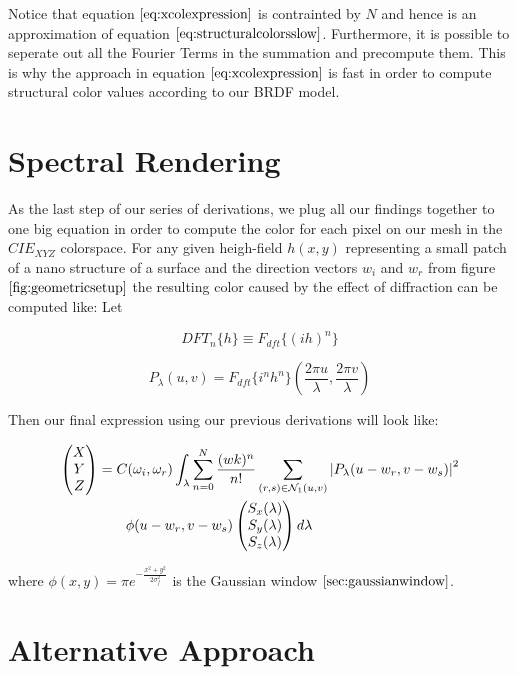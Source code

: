 Notice that equation $\ref{eq:xcolexpression}$ is contrainted by $N$ and hence is an approximation of equation $\ref{eq:structuralcolorsslow}$. Furthermore, it is possible to seperate out all the Fourier Terms in the summation and precompute them. This is why the approach in equation $\ref{eq:xcolexpression}$ is fast in order to compute structural color values according to our BRDF model.

\section{Spectral Rendering}
\label{sec:spectralrendering}
As the last step of our series of derivations, we plug all our findings together to one big equation in order to compute the color for each pixel on our mesh in the $CIE_{XYZ}$ colorspace. For any given heigh-field $h(x,y)$ representing a small patch of a nano structure of a surface and the direction vectors $w_i$ and $w_r$ from figure $\ref{fig:geometricsetup}$ the resulting color caused by the effect of diffraction can be computed like: Let 

\begin{equation}
DFT_{n}\{h\} \equiv {F}_{dft}\{(ih)^n\}
\label{eq:dftnterm}
\end{equation}

\begin{equation}
P_{\lambda}(u,v) = {F}_{dft}\{i^n h^n\}(\frac{2\pi u}{\lambda},\frac{2\pi v}{\lambda})
\end{equation}

Then our final expression using our previous derivations will look like:

\begin{equation}
\begin{split}
\colvec[X]{Y}{Z}& = C(\omega_i,\omega_r) \int_{\lambda} \sum_{n=0}^N  \frac{(wk)^n}{n!} \sum_{(r,s) \in \mathcal{N}_1(u,v)} \left| P_{\lambda}(u-w_r,v-w_s) \right|^2 \\
& \quad \quad  \phi(u-w_r, v-w_s) \colvec[S_x(\lambda)]{S_y(\lambda)}{S_z(\lambda)}d\lambda
\end{split}
\label{eq:finalexpression}
\end{equation}

where $\phi(x,y) = \pi e^{-\frac{x^2 + y^2}{2\sigma_{f}^2}}$ is the Gaussian window $\ref{sec:gaussianwindow}$.

\section{Alternative Approach}
